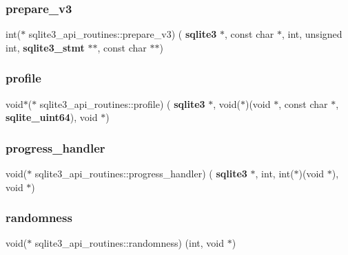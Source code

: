 \mbox{\label{structsqlite3__api__routines_a99bd8831d44559ddc7f994d49aa1097e}} 
\subsubsection{prepare\_v3}
{\footnotesize\ttfamily int($\ast$ sqlite3\+\_\+api\+\_\+routines\+::prepare\+\_\+v3) (\textbf{ sqlite3} $\ast$, const char $\ast$, int, unsigned int, \textbf{ sqlite3\+\_\+stmt} $\ast$$\ast$, const char $\ast$$\ast$)}

\mbox{\label{structsqlite3__api__routines_afa3554d38034ec4c0a339e2e908732db}} 
\subsubsection{profile}
{\footnotesize\ttfamily void$\ast$($\ast$ sqlite3\+\_\+api\+\_\+routines\+::profile) (\textbf{ sqlite3} $\ast$, void($\ast$)(void $\ast$, const char $\ast$, \textbf{ sqlite\+\_\+uint64}), void $\ast$)}

\mbox{\label{structsqlite3__api__routines_a58d79a7091ade0d1630d62ecf1931e9d}} 
\subsubsection{progress\_handler}
{\footnotesize\ttfamily void($\ast$ sqlite3\+\_\+api\+\_\+routines\+::progress\+\_\+handler) (\textbf{ sqlite3} $\ast$, int, int($\ast$)(void $\ast$), void $\ast$)}

\mbox{\label{structsqlite3__api__routines_addef940dbc8b1d1c1356f3e4ee494540}} 
\subsubsection{randomness}
{\footnotesize\ttfamily void($\ast$ sqlite3\+\_\+api\+\_\+routines\+::randomness) (int, void $\ast$)}

\mbox{\label{structsqlite3__api__routines_a40270284cc1abb0818ade7b41351bb5b}} 
